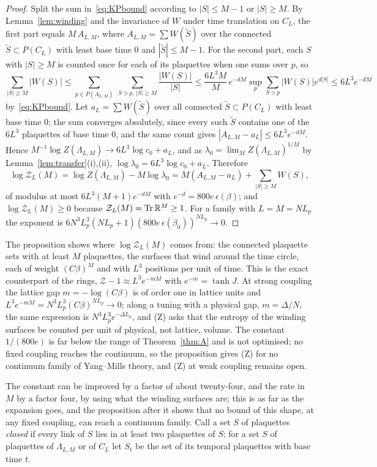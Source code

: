 \begin{proof}
Split the sum in~\eqref{eq:KPbound} according to $|S|\le M-1$ or $|S|\ge M$.
By Lemma~\ref{lem:winding} and the invariance of $W$ under time translation
on $C_L$, the first part equals $M\,A_{L,M}$, where $A_{L,M}=\sum W(\tilde
S)$ over the connected $\tilde S\subset P(C_L)$ with least base time $0$ and
$|\tilde S|\le M-1$. For the second part, each $S$ with $|S|\ge M$ is
counted once for each of its plaquettes when one sums over $p$, so
\[
\sum_{|S|\ge M}|W(S)|\le\sum_{p\in P(\Lambda_{L,M})}\ \sum_{S\ni p,\,|S|\ge M}
\frac{|W(S)|}{|S|}\le\frac{6L^3M}{M}\,e^{-dM}\sup_p\sum_{S\ni p}|W(S)|e^{d|S|}
\le6L^3e^{-dM}
\]
by~\eqref{eq:KPbound}. Let $a_L=\sum W(\tilde S)$ over all connected
$\tilde S\subset P(C_L)$ with least base time $0$; the sum converges
absolutely, since every such $\tilde S$ contains one of the $6L^3$
plaquettes of base time $0$, and the same count gives $|A_{L,M}-a_L|\le
6L^3e^{-dM}$. Hence $M^{-1}\log Z(\Lambda_{L,M})\to6L^3\log c_0+a_L$, and as
$\lambda_0=\lim_MZ(\Lambda_{L,M})^{1/M}$ by Lemma~\ref{lem:transfer}(i),(ii),
$\log\lambda_0=6L^3\log c_0+a_L$. Therefore
\[
\log\mathcal Z_L(M)=\log Z(\Lambda_{L,M})-M\log\lambda_0=M(A_{L,M}-a_L)+
\sum_{|S|\ge M}W(S),
\]
of modulus at most $6L^3(M+1)e^{-dM}$ with $e^{-d}=800e\,\epsilon(\beta)$;
and $\log\mathcal Z_L(M)\ge0$ because $\mathcal Z_L(M)=\operatorname{Tr}\mathbb R^M\ge1$.
For a family with $L=M=NL_p$ the exponent is $6N^3L_p^3(NL_p+1)(800e\,
\epsilon(\beta_0))^{NL_p}\to0$.
\end{proof}

The proposition shows where $\log\mathcal Z_L(M)$ comes from: the connected
plaquette sets with at least $M$ plaquettes, the surfaces that wind around
the time circle, each of weight $(C\beta)^M$ and with $L^3$ positions per
unit of time. This is the exact counterpart of the rings, $\mathcal Z-1
\approx L^3e^{-mM}$ with $e^{-m}=\tanh J$. At strong coupling the lattice
gap $m=-\log(C\beta)$ is of order one in lattice units and $L^3e^{-mM}=
N^3L_p^3(C\beta)^{NL_p}\to0$; along a tuning with a physical gap, $m=
\Delta/N$, the same expression is $N^3L_p^3e^{-\Delta L_p}$, and (Z) asks
that the entropy of the winding surfaces be counted per unit of physical,
not lattice, volume. The constant $1/(800e)$ is far below the range of
Theorem~\ref{thm:A} and is not optimised; no fixed coupling reaches the
continuum, so the proposition gives (Z) for no continuum family of
Yang--Mills theory, and (Z) at weak coupling remains open.

The constant can be improved by a factor of about twenty-four, and the
rate in $M$ by a factor four, by using what the winding surfaces are;
this is as far as the expansion goes, and the proposition after it shows
that no bound of this shape, at any fixed coupling, can reach a continuum
family. Call a set $S$ of plaquettes \emph{closed} if every link of $S$
lies in at least two plaquettes of $S$; for a set $S$ of plaquettes of
$\Lambda_{L,M}$ or of $C_L$ let $S_t$ be the set of its temporal plaquettes
with base time $t$.

